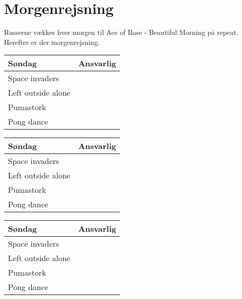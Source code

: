 \section{Morgenrejsning}
Russerne vækkes hver morgen til Ace of Base - Beautiful Morning på repeat. Herefter er der morgenrejsning.

\begin{center}
\begin{tabular}{|p{3cm}|p{7cm}|}
\hline \textbf{Søndag}      & \textbf{Ansvarlig}    \\\hline
\hline  Space invaders      &     \\
\hline  Left outside alone  &     \\
\hline  Pumastork           &     \\
\hline  Pong dance          &     \\

\hline
\end{tabular}

\begin{tabular}{|p{3cm}|p{7cm}|}
\hline \textbf{Søndag}      & \textbf{Ansvarlig}    \\\hline
\hline  Space invaders      &     \\
\hline  Left outside alone  &     \\
\hline  Pumastork           &     \\
\hline  Pong dance          &     \\

\hline
\end{tabular}

\begin{tabular}{|p{3cm}|p{7cm}|}
\hline \textbf{Søndag}      & \textbf{Ansvarlig}    \\\hline
\hline  Space invaders      &     \\
\hline  Left outside alone  &     \\
\hline  Pumastork           &     \\
\hline  Pong dance          &     \\

\hline
\end{tabular}
\end{center}